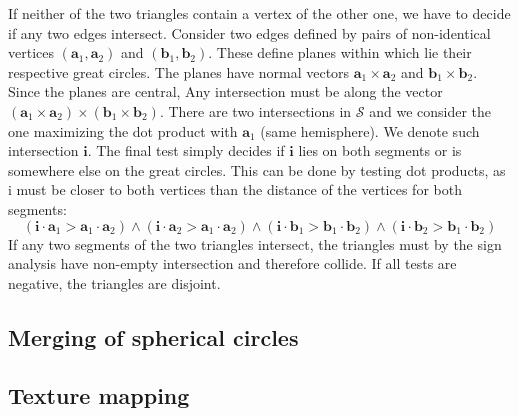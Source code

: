 If neither of the two triangles contain a vertex of the other one, we have to decide if any two edges intersect. Consider two edges defined by pairs of non-identical vertices $(\mathbf{a}_1, \mathbf{a}_2)$ and $(\mathbf{b}_1, \mathbf{b}_2)$. These define planes within which lie their respective great circles. The planes have normal vectors $\mathbf{a}_1 \times \mathbf{a}_2$ and $\mathbf{b}_1 \times \mathbf{b}_2$. Since the planes are central, Any intersection must be along the vector $(\mathbf{a}_1 \times \mathbf{a}_2)\times(\mathbf{b}_1 \times \mathbf{b}_2)$. There are two intersections in $\mathcal{S}$ and we consider the one maximizing the dot product with $\mathbf{a}_1$ (same hemisphere). We denote such intersection $\mathbf{i}$. The final test simply decides if $\mathbf{i}$ lies on both segments or is somewhere else on the great circles. This can be done by testing dot products, as i must be closer to both vertices than the distance of the vertices for both segments:
$$(\mathbf{i}\cdot\mathbf{a}_1 > \mathbf{a}_1\cdot\mathbf{a}_2) \land (\mathbf{i}\cdot\mathbf{a}_2 > \mathbf{a}_1\cdot\mathbf{a}_2)\land(\mathbf{i}\cdot\mathbf{b}_1 > \mathbf{b}_1\cdot\mathbf{b}_2) \land (\mathbf{i}\cdot\mathbf{b}_2 > \mathbf{b}_1\cdot\mathbf{b}_2)$$
If any two segments of the two triangles intersect, the triangles must by the sign analysis have non-empty intersection and therefore collide. If all tests are negative, the triangles are disjoint.
\subsection{Merging of spherical circles}
\subsection{Texture mapping}


